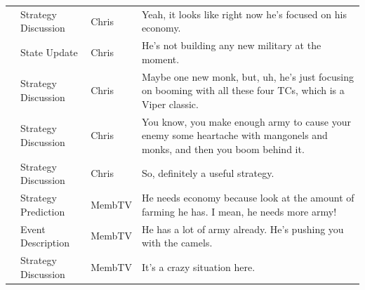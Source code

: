 {\begin{longtable}{@{}>{\theAppRow}r|L{2.3cm}L{1.0cm}U{11.55cm}@{}}
    & Strategy Discussion      & Chris        & Yeah, it looks like right now he's focused on his economy.                                                                                                                                                                                                       \\
    & State Update          & Chris        & He's not building any new military at the moment.                                                                                                                                                                                                                \\
    & Strategy Discussion   & Chris        & Maybe one new monk, but, uh, he's just focusing on booming with all these four TCs, which is a Viper classic.                                                                                                                                                    \\
    & Strategy Discussion   & Chris        & You know, you make enough army to cause your enemy some heartache with mangonels and monks, and then you boom behind it.                                                                                                                                         \\
    & Strategy Discussion   & Chris        & So, definitely a useful strategy.                                                                                                                                                                                                                                \\
    & Strategy Prediction   & MembTV       & He needs economy because look at the amount of farming he has. I mean, he needs more army!                                                                                                                                                                       \\
    & Event Description     & MembTV       & He has a lot of army already. He's pushing you with the camels.                                                                                                                                                                                                  \\
    & Strategy Discussion   & MembTV       & It's a crazy situation here.                                                                                                                                                                                                                                     \\

\end{longtable}}
